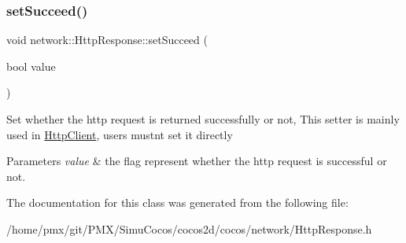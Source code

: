 \subsubsection{\texorpdfstring{set\+Succeed()}{setSucceed()}\hspace{0.1cm}{\footnotesize\ttfamily [2/2]}}
{\footnotesize\ttfamily void network\+::\+Http\+Response\+::set\+Succeed (\begin{DoxyParamCaption}\item[{bool}]{value }\end{DoxyParamCaption})\hspace{0.3cm}{\ttfamily [inline]}}

Set whether the http request is returned successfully or not, This setter is mainly used in \hyperlink{classnetwork_1_1HttpClient}{Http\+Client}, users mustn\textquotesingle{}t set it directly 
\begin{DoxyParams}{Parameters}
{\em value} & the flag represent whether the http request is successful or not. \\
\hline
\end{DoxyParams}


The documentation for this class was generated from the following file\+:\begin{DoxyCompactItemize}
\item 
/home/pmx/git/\+P\+M\+X/\+Simu\+Cocos/cocos2d/cocos/network/Http\+Response.\+h\end{DoxyCompactItemize}
